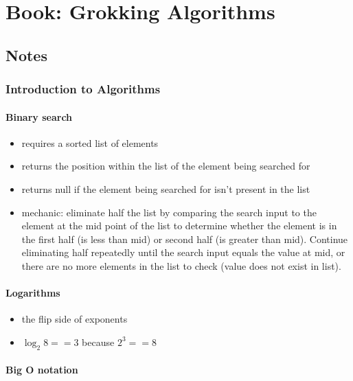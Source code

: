 \twocolumn
\chapter{Book: Grokking Algorithms}
\section{Notes}
\subsection{Introduction to Algorithms}
\subsubsection{Binary search}
\begin{itemize}
\item requires a sorted list of elements
\item returns the position within the list of the element being searched for
\item returns null if the element being searched for isn't present in the list
\item mechanic: eliminate half the list by comparing the search input to the element at the mid point of the list to determine whether the element is in the first half (is less than mid) or second half (is greater than mid). Continue eliminating half repeatedly until the search input equals the value at mid, or there are no more elements in the list to check (value does not exist in list).
\end{itemize}

\subsubsection{Logarithms}

\begin{itemize}
\item the flip side of exponents 
\item $\log_{2}8 == 3$ because $2^3 == 8$
\end{itemize}

\subsubsection{Big O notation}

